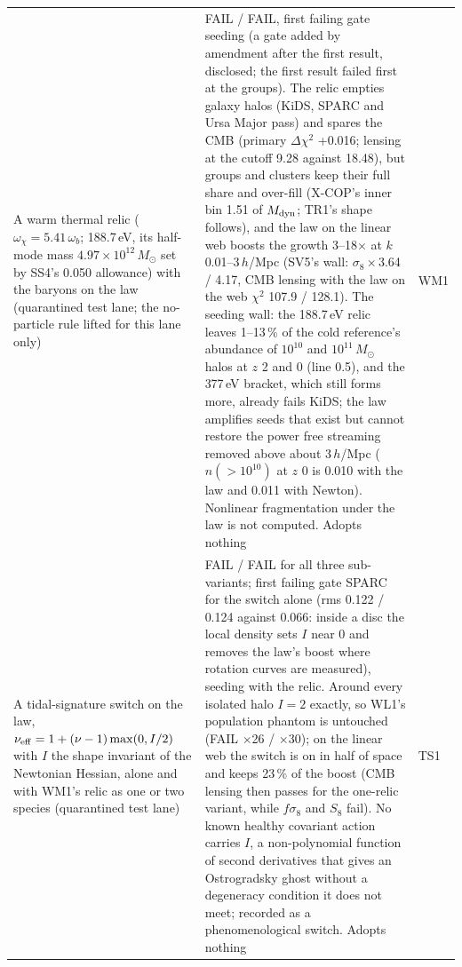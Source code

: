 \documentclass[10pt]{article}
\begin{document}
\begin{longtable}{@{}p{4.4cm}p{8.6cm}p{2.8cm}@{}}
A warm thermal relic ($\omega_\chi=5.41\,\omega_b$; 188.7\,eV, its half-mode mass $4.97\times10^{12}\,M_\odot$ set by SS4's 0.050 allowance) with the baryons on the law (quarantined test lane; the no-particle rule lifted for this lane only) & FAIL / FAIL, first failing gate seeding (a gate added by amendment after the first result, disclosed; the first result failed first at the groups). The relic empties galaxy halos (KiDS, SPARC and Ursa Major pass) and spares the CMB (primary $\Delta\chi^2$ +0.016; lensing at the cutoff 9.28 against 18.48), but groups and clusters keep their full share and over-fill (X-COP's inner bin 1.51 of $M_{\rm dyn}$; TR1's shape follows), and the law on the linear web boosts the growth 3--18$\times$ at $k$ 0.01--3\,$h$/Mpc (SV5's wall: $\sigma_8\times$3.64 / 4.17, CMB lensing with the law on the web $\chi^2$ 107.9 / 128.1). The seeding wall: the 188.7\,eV relic leaves 1--13\,\% of the cold reference's abundance of $10^{10}$ and $10^{11}\,M_\odot$ halos at $z$ 2 and 0 (line 0.5), and the 377\,eV bracket, which still forms more, already fails KiDS; the law amplifies seeds that exist but cannot restore the power free streaming removed above about 3\,$h$/Mpc ($n(>10^{10})$ at $z$ 0 is 0.010 with the law and 0.011 with Newton). Nonlinear fragmentation under the law is not computed. Adopts nothing & WM1\\
A tidal-signature switch on the law, $\nu_{\rm eff}=1+(\nu-1)\max(0,I/2)$ with $I$ the shape invariant of the Newtonian Hessian, alone and with WM1's relic as one or two species (quarantined test lane) & FAIL / FAIL for all three sub-variants; first failing gate SPARC for the switch alone (rms 0.122 / 0.124 against 0.066: inside a disc the local density sets $I$ near 0 and removes the law's boost where rotation curves are measured), seeding with the relic. Around every isolated halo $I=2$ exactly, so WL1's population phantom is untouched (FAIL $\times$26 / $\times$30); on the linear web the switch is on in half of space and keeps 23\,\% of the boost (CMB lensing then passes for the one-relic variant, while $f\sigma_8$ and $S_8$ fail). No known healthy covariant action carries $I$, a non-polynomial function of second derivatives that gives an Ostrogradsky ghost without a degeneracy condition it does not meet; recorded as a phenomenological switch. Adopts nothing & TS1\\

\end{longtable}
\end{document}
